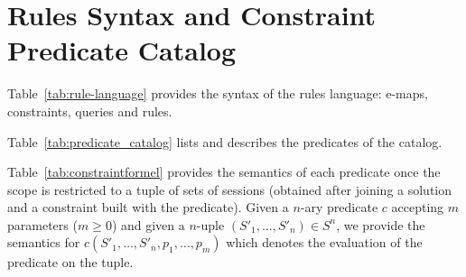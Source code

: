 \section{Rules Syntax and Constraint Predicate Catalog}
\label{appendix:constraintcatalog}


Table~\ref{tab:rule-language}
provides the syntax of the rules language: e-maps, constraints, queries and rules.


Table~\ref{tab:predicate_catalog}
lists and describes the predicates of the catalog.



Table~\ref{tab:constraintformel} provides the semantics of each predicate
once the scope is restricted to a tuple of sets of sessions
(obtained after joining a solution and a constraint built with the predicate).
Given
a $n$-ary predicate $c$ accepting $m$ parameters ($m\geq 0$)
and given a $n$-uple %
$(S'_1,\ldots,S'_n)\in{S}^n$,
we provide the semantics for $c(S'_1,\ldots,S'_n,p_1,\ldots,p_m)$
which denotes the evaluation of the predicate on the tuple.




